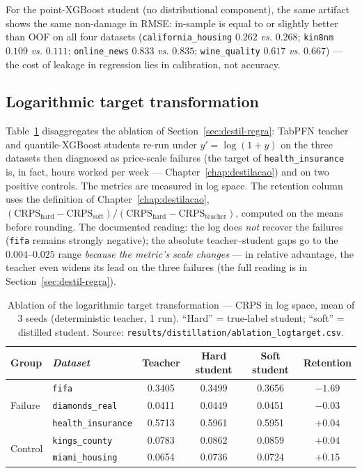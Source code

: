 For the point-XGBoost student (no distributional component), the same
artifact shows the same non-damage in RMSE: in-sample is equal to or
slightly better than OOF on all four datasets
(\texttt{california\_\allowbreak housing} $0.262$ \emph{vs.} $0.268$;
\texttt{kin8nm} $0.109$ \emph{vs.} $0.111$; \texttt{online\_news}
$0.833$ \emph{vs.} $0.835$; \texttt{wine\_quality} $0.617$ \emph{vs.}
$0.667$) --- the cost of leakage in regression lies in calibration,
not accuracy.

\subsection{Logarithmic target transformation}

Table~\ref{tab:app-abl-log} disaggregates the ablation of
Section~\ref{sec:destil-regra}: TabPFN teacher and quantile-XGBoost
students re-run under $y' = \log(1+y)$ on the three datasets then
diagnosed as price-scale failures (the target of
\texttt{health\_insurance} is, in fact, hours worked per week ---
Chapter~\ref{chap:destilacao}) and on two positive controls. The
metrics are measured in log space. The retention column uses the
definition of Chapter~\ref{chap:destilacao},
$(\mathrm{CRPS}_{\text{hard}} - \mathrm{CRPS}_{\text{soft}}) /
(\mathrm{CRPS}_{\text{hard}} - \mathrm{CRPS}_{\text{teacher}})$,
computed on the means before rounding. The documented reading: the
log does \emph{not} recover the failures (\texttt{fifa} remains
strongly negative); the absolute teacher--student gaps go to the
$0.004$--$0.025$ range \emph{because the metric's scale changes} ---
in relative advantage, the teacher even widens its lead on the three
failures (the full reading is in Section~\ref{sec:destil-regra}).

\begin{table}[htbp]
\centering\small
\caption[Log-target ablation --- disaggregated]{Ablation of the
logarithmic target transformation --- CRPS in log space, mean of 3
seeds (deterministic teacher, 1 run). ``Hard'' = true-label student;
``soft'' = distilled student. Source:
\texttt{results/\allowbreak distillation/\allowbreak ablation\_\allowbreak logtarget.\allowbreak csv}.}
\label{tab:app-abl-log}
\begin{tabular}{llcccc}
\toprule
Group & \emph{Dataset} & Teacher & Hard student & Soft student &
Retention \\
\midrule
\multirow{3}{*}{Failure}
 & \texttt{fifa}              & 0.3405 & 0.3499 & 0.3656 & $-1.69$ \\
 & \texttt{diamonds\_real}    & 0.0411 & 0.0449 & 0.0451 & $-0.03$ \\
 & \texttt{health\_\allowbreak insurance} & 0.5713 & 0.5961 & 0.5951 & $+0.04$ \\
\midrule
\multirow{2}{*}{Control}
 & \texttt{kings\_county}     & 0.0783 & 0.0862 & 0.0859 & $+0.04$ \\
 & \texttt{miami\_housing}    & 0.0654 & 0.0736 & 0.0724 & $+0.15$ \\
\bottomrule
\end{tabular}
\end{table}

